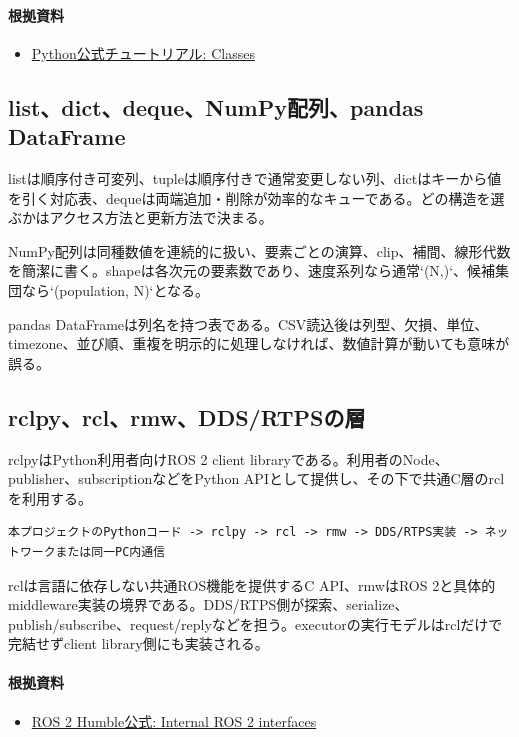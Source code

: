 \documentclass[a4paper,11pt]{article}
\begin{document}
\paragraph{根拠資料}
\begin{itemize}[leftmargin=1.6em]
\item \href{https://docs.python.org/3/tutorial/classes.html}{Python公式チュートリアル: Classes}
\end{itemize}

\subsection{list、dict、deque、NumPy配列、pandas DataFrame}
listは順序付き可変列、tupleは順序付きで通常変更しない列、dictはキーから値を引く対応表、dequeは両端追加・削除が効率的なキューである。どの構造を選ぶかはアクセス方法と更新方法で決まる。


NumPy配列は同種数値を連続的に扱い、要素ごとの演算、clip、補間、線形代数を簡潔に書く。shapeは各次元の要素数であり、速度系列なら通常`(N,)`、候補集団なら`(population, N)`となる。


pandas DataFrameは列名を持つ表である。CSV読込後は列型、欠損、単位、timezone、並び順、重複を明示的に処理しなければ、数値計算が動いても意味が誤る。



\subsection{rclpy、rcl、rmw、DDS/RTPSの層}
rclpyはPython利用者向けROS 2 client libraryである。利用者のNode、publisher、subscriptionなどをPython APIとして提供し、その下で共通C層のrclを利用する。


\begin{lstlisting}
本プロジェクトのPythonコード -> rclpy -> rcl -> rmw -> DDS/RTPS実装 -> ネットワークまたは同一PC内通信
\end{lstlisting}


rclは言語に依存しない共通ROS機能を提供するC API、rmwはROS 2と具体的middleware実装の境界である。DDS/RTPS側が探索、serialize、publish/subscribe、request/replyなどを担う。executorの実行モデルはrclだけで完結せずclient library側にも実装される。

\paragraph{根拠資料}
\begin{itemize}[leftmargin=1.6em]
\item \href{https://docs.ros.org/en/humble/Concepts/About-Internal-Interfaces.html}{ROS 2 Humble公式: Internal ROS 2 interfaces}
\end{itemize}
\end{document}
